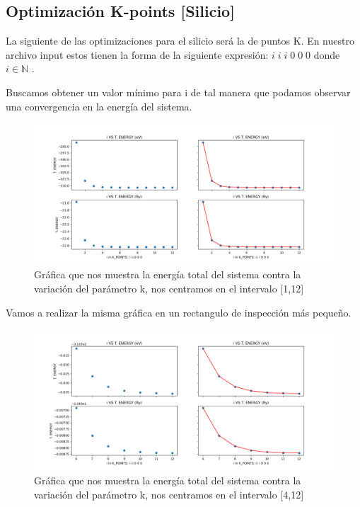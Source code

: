 \newpage

\subsection{Optimización K-points [Silicio] }

La siguiente de las optimizaciones para el silicio será la de puntos K. En nuestro archivo input estos
tienen la forma de la siguiente expresión: $ i \; i \; i \; 0 \; 0 \; 0$ donde $ i \in \mathbb{N}  $ .

\vspace{0.5cm}

Buscamos obtener un valor mínimo para i de tal manera que podamos observar una convergencia en la 
energía del sistema.

\begin{figure}[H]
    \centering
    \includegraphics[scale=0.46]{images/k_points_vs_T_energy.png}
    \caption{Gráfica que nos muestra la energía total del sistema contra la variación del parámetro k, nos centramos en el intervalo [1,12]}
\end{figure}

Vamos a realizar la misma gráfica en un rectangulo de inspección más pequeño.

\begin{figure}[H]
    \centering
    \includegraphics[scale=0.46]{images/k_points_vs_T_energy_neighborhood.png}
    \caption{Gráfica que nos muestra la energía total del sistema contra la variación del parámetro k, nos centramos en el intervalo [4,12]}
\end{figure}

